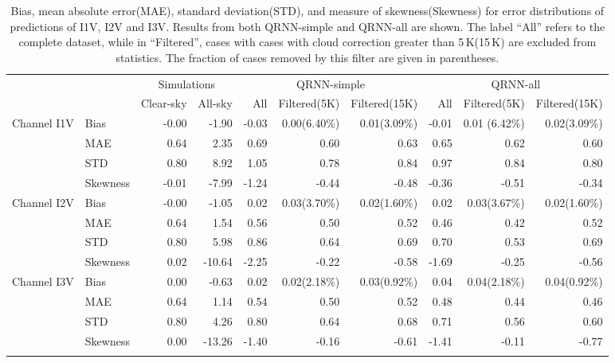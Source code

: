\documentclass[amt, manuscript]{copernicus}
\begin{document}
\begin{table}[t]
	\caption{Bias, mean absolute error(MAE), standard deviation(STD), and measure of skewness(Skewness) for error distributions of predictions of I1V, I2V and I3V. Results from both QRNN-simple and QRNN-all are shown. The label ``All'' refers to the complete dataset, while in ``Filtered'', cases with cases with cloud correction greater than 5\,K(15\,K) are excluded from statistics. The fraction of cases removed by this filter are given in parentheses.}
	\label{tab:error_statistics_ici}
	\begin{tabular}{llrr|rrr|rrr}
		\tophline
		&&\multicolumn{2}{c|}{Simulations}& \multicolumn{3}{c|}{QRNN-simple} & \multicolumn{3}{c}{QRNN-all}\\
		\cline{3-10}
		&&   Clear-sky &   All-sky &   All &   Filtered(5K) & Filtered(15K) & All &   Filtered(5K) & Filtered(15K) \\
		\middlehline

Channel I1V &Bias     &   -0.00 &   -1.90&    -0.03 &      0.00(6.40\%) & 0.01(3.09\%)&-0.01 &0.01 (6.42\%)& 0.02(3.09\%) \\
			&MAE      &    0.64 &    2.35&     0.69 &      0.60 & 0.63  &  0.65 & 0.62& 0.60\\
			&STD      &    0.80 &    8.92&     1.05 &      0.78 &  0.84 &  0.97 & 0.84& 0.80\\
			&Skewness &   -0.01 &   -7.99&    -1.24 &     -0.44 & -0.48 & -0.36 &-0.51&-0.34\\
\middlehline
Channel I2V	&Bias     &   -0.00 &         -1.05 &    0.02 &      0.03(3.70\%)&0.02(1.60\%) &  0.02&   0.03(3.67\%)& 0.02(1.60\%)\\
			&MAE      &    0.64 &          1.54 &    0.56 &      0.50&  	  0.52 &  0.46&   0.42 &  0.52\\
			&STD      &    0.80 &          5.98 &    0.86 &      0.64&  	  0.69 &  0.70&   0.53 &  0.69\\
			&Skewness &    0.02 &        -10.64 &   -2.25 &     -0.22& 		 -0.58 & -1.69& -0.25 &-0.56\\
\middlehline	
Channel I3V &Bias     &   0.00  &         -0.63 &    0.02 &      0.02(2.18\%)&0.03(0.92\%)&	 0.04 &  0.04(2.18\%) & 0.04(0.92\%) \\
			&MAE      &   0.64  &          1.14 &    0.54 &      0.50		& 0.52&0.48 &    0.44 & 0.46\\
			&STD      &   0.80  &          4.26 &    0.80 &      0.64		& 0.68&0.71 &     0.56 & 0.60\\
			&Skewness &   0.00  &        -13.26 &   -1.40 &     -0.16		&-0.61&-1.41&   -0.11 & -0.77\\	
		\bottomhline
	\end{tabular}
	\belowtable{} %
\end{table}
\end{document}

